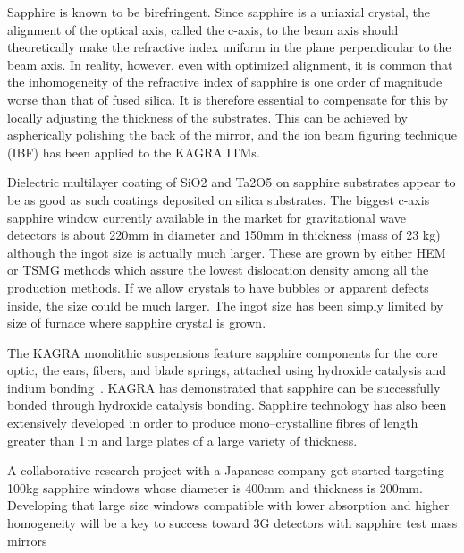 Sapphire is known to be birefringent. Since sapphire is a uniaxial crystal, the alignment of the optical axis, called the c-axis, to the beam axis should theoretically make the refractive index uniform in the plane perpendicular to the beam axis. In reality, however, even with optimized alignment, it is common that the inhomogeneity of the refractive index of sapphire is one order of magnitude worse than that of fused silica. It is therefore essential to compensate for this by locally adjusting the thickness of the substrates. This can be achieved by aspherically polishing the back of the mirror, and the ion beam figuring technique (IBF) has been applied to the KAGRA ITMs.

Dielectric multilayer coating of SiO2 and Ta2O5 on sapphire substrates appear to be as good as such coatings deposited on silica substrates\cite{Hirose_2014b}.
The biggest c-axis sapphire window currently available in the market for gravitational wave detectors is about 220mm in diameter and 150mm in thickness (mass of 23 kg) although the ingot size is actually much larger. These are grown by either HEM or TSMG methods which assure the lowest dislocation density among all the production methods. If we allow crystals to have bubbles or apparent defects inside, the size could be much larger. The ingot size has been simply limited by size of furnace where sapphire crystal is grown.

The KAGRA monolithic suspensions feature sapphire components for the core optic, the ears, fibers, and blade springs, attached using hydroxide catalysis and indium bonding~\cite{Kumar:2016_KAGRA}. 
KAGRA has demonstrated that sapphire can be successfully bonded through hydroxide catalysis bonding. 
Sapphire technology has also been extensively developed in order to produce mono--crystalline fibres of length greater than 1\,m and large plates of a large variety of thickness.

A collaborative research project with a Japanese company got started targeting 100kg sapphire windows whose diameter is 400mm and thickness is 200mm. Developing that large size windows compatible with lower absorption and higher homogeneity will be a key to success toward 3G detectors with sapphire test mass mirrors

